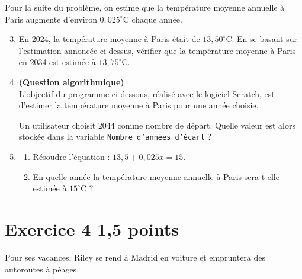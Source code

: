 \documentclass[12pt,a4paper,french]{article}
\begin{document}
Pour la suite du problème, on estime que la température moyenne annuelle à Paris augmente d'environ $0{,}025^{\circ}$C chaque année.

\begin{enumerate}
	\setcounter{enumi}{2}
	\item En 2024, la température moyenne à Paris était de $13{,}50^{\circ}$C. En se basant sur l'estimation annoncée ci-dessus, vérifier que la température moyenne à Paris en 2034 est estimée à $13{,}75^{\circ}$C.
	\item \textbf{(Question algorithmique)}\\
	L'objectif du programme ci-dessous, réalisé avec le logiciel Scratch, est d'estimer la température moyenne à Paris pour une année choisie.

	\begin{center}
	\begin{scratch}[scale=0.9,num blocks]
	\end{scratch}
	\end{center}

	Un utilisateur choisit 2044 comme nombre de départ. Quelle valeur est alors stockée dans la variable \texttt{Nombre d'années d'écart} ?
	\item 
	\begin{enumerate}
		\item Résoudre l'équation : $13{,}5 + 0{,}025x = 15$.
		\item En quelle année la température moyenne annuelle à Paris sera-t-elle estimée à $15^{\circ}$C ?
	\end{enumerate}
\end{enumerate}

\section*{Exercice 4 \hfill 1,5 points}

Pour ses vacances, Riley se rend à Madrid en voiture et empruntera des autoroutes à péages.
\end{document}
